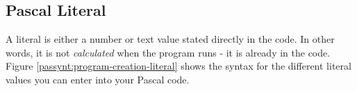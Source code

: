 \clearpage
\subsection{Pascal Literal} %
\label{sub:program-creation-pas_literal}

A literal is either a number or text value stated directly in the code. In other words, it is not \emph{calculated} when the program runs - it is already in the code. Figure \ref{passynt:program-creation-literal} shows the syntax for the different literal values you can enter into your Pascal code.



